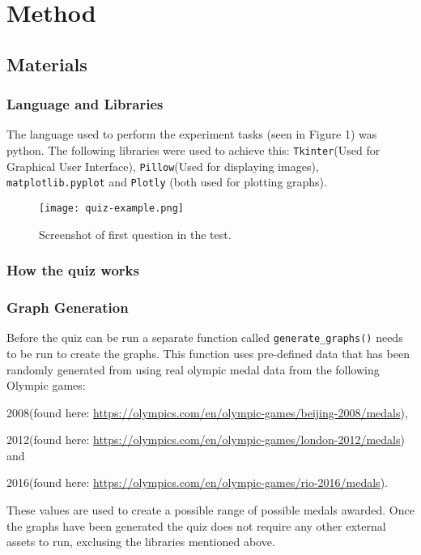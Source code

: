 \section{Method}


\subsection{Materials}
\subsubsection{Language and Libraries}
\quad The language used to perform the experiment tasks (seen in Figure 1) was python. The following libraries were used to achieve this:
\verb|Tkinter|(Used for Graphical User Interface), \verb|Pillow|(Used for displaying images), \verb|matplotlib.pyplot| and \verb|Plotly| (both used for plotting graphs).

\begin{figure}[H]
    \centering
    \texttt{[image: quiz-example.png]}
    \caption{Screenshot of first question in the test.}
\end{figure}

\subsubsection{How the quiz works}
\subsubsection*{Graph Generation}
\begin{flushleft}
    \quad Before the quiz can be run a separate function called \verb|generate_graphs()| needs to be run to create the graphs.
    This function uses pre-defined data that has been randomly generated from using real olympic medal data from the following Olympic games:

    2008(found here: \url{https://olympics.com/en/olympic-games/beijing-2008/medals}), 
    
    2012(found here: \url{https://olympics.com/en/olympic-games/london-2012/medals}) and 
    
    2016(found here: \url{https://olympics.com/en/olympic-games/rio-2016/medals}). 
    
    These values are used to create a possible range of possible medals awarded.
    Once the graphs have been generated the quiz does not require any other external assets to run, exclusing the libraries mentioned above.
\end{flushleft}
    
